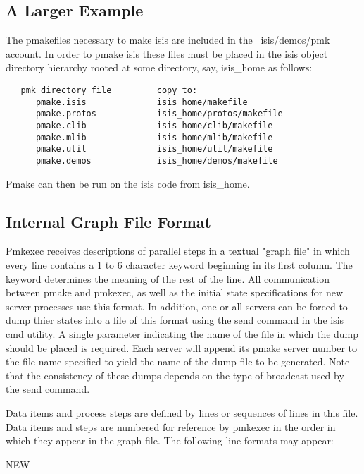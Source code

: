 \begin{itemize}
\subsection*{A Larger Example}

The pmakefiles necessary to make isis are included in the ~isis/demos/pmk
account.  In order to pmake isis these files must be placed in the isis object 
directory hierarchy rooted at some directory, say, isis\_home as follows:

\begin{verbatim}
   pmk directory file         copy to:
      pmake.isis              isis_home/makefile
      pmake.protos            isis_home/protos/makefile
      pmake.clib              isis_home/clib/makefile
      pmake.mlib              isis_home/mlib/makefile
      pmake.util              isis_home/util/makefile
      pmake.demos             isis_home/demos/makefile
\end{verbatim}

Pmake can then be run on the isis code from isis\_home.


\subsection*{Internal Graph File Format}

Pmkexec receives descriptions of parallel steps in a textual "graph file" in
which every line contains a 1 to 6 character keyword beginning in its first
column.  The keyword determines the meaning of the rest of the line.
All communication between pmake and pmkexec, as well as the initial state
specifications for new server processes use this format.  In addition, one or
all servers can be forced to dump thier states into a file of this format 
using the send command in the isis cmd utility.  A single parameter indicating
the name of the file in which the dump should be placed is required.  Each
server will append its pmake server number to the file name specified to
yield the name of the dump file to be generated.  Note that the consistency of
these dumps depends on the type of broadcast used by the send command.

Data items and process steps are defined by lines or sequences of lines in
this file.  Data items and steps are numbered for reference by pmkexec in the
order in which they appear in the graph file.  The following line formats may
appear:

\begin{description}
\item[NEW]


\end{description}
\end{itemize}
